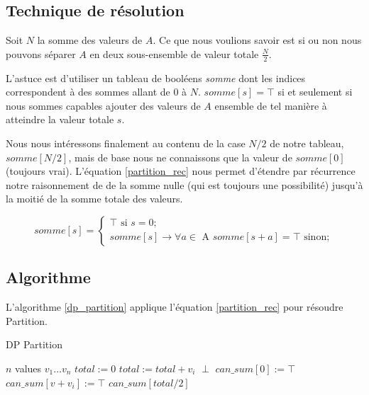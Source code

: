 \subsection{Technique de résolution}

Soit $N$ la somme des valeurs de $A$. Ce que nous voulions savoir est si ou non nous pouvons séparer $A$ en deux sous-ensemble de valeur totale $\frac{N}{2}$. 

L'astuce est d'utiliser un tableau de booléens \emph{somme} dont les indices correspondent à des sommes allant de $0$ à $N$. $somme[s] = \top$ si et seulement si nous sommes capables ajouter des valeurs de $A$ ensemble de tel manière à atteindre la valeur totale $s$. 

Nous nous intéressons finalement au contenu de la case $N/2$ de notre tableau, $somme[N/2]$, mais de base nous ne connaissons que la valeur de $somme[0]$ (toujours vrai). L'équation \ref{partition_rec} nous permet d'étendre par récurrence notre raisonnement de de la somme nulle (qui est toujours une possibilité) jusqu'à la moitié de la somme totale des valeurs.

\begin{equation}
\label{partition_rec}
somme[s] = 
\begin{cases}
\top \text{ si } s = 0; \\
somme[s] \rightarrow \forall a \in \text{ A } somme[s + a] = \top \text{ sinon} ;
\end{cases}
\end{equation}

\subsection{Algorithme}
L'algorithme \ref{dp_partition} applique l'équation \ref{partition_rec} pour résoudre Partition.


\begin{algorithm}[!ht]
\caption{DP Partition}
\label{dp_partition}
\begin{algorithmic}[1]
\REQUIRE $n$ values $v_1 \dots v_n$
\STATE $total := 0$
	\STATE $total := total + v_i$
\ENDFOR
{}
	\RETURN $\perp$
\ENDIF
\STATE $can\_sum[0] := \top$ 
			\STATE $can\_sum[v + v_i] := \top$
		\ENDIF
	\ENDFOR
\ENDFOR
\RETURN $can\_sum[total/2]$
\end{algorithmic}
\end{algorithm}


